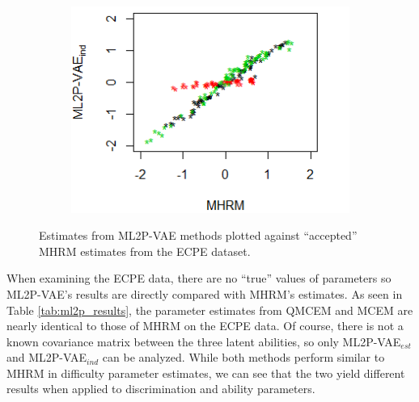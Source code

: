 \begin{figure}[h]
\begin{subfigure}{.32\textwidth}
    \end{subfigure}
    \begin{subfigure}{.32\textwidth}
      \centering
      \includegraphics[width=.9\linewidth]{img/ml_journal_results/ecpe/vae_ind_theta_ecpe.png}
    \end{subfigure}
    \caption{Estimates from ML2P-VAE methods plotted against ``accepted'' MHRM estimates from the ECPE dataset.}
    \label{fig:ecpe_cor}
\end{figure}

When examining the ECPE data, there are no ``true'' values of parameters so ML2P-VAE's results are directly compared with MHRM's estimates. As seen in Table \ref{tab:ml2p_results}, the parameter estimates from QMCEM and MCEM are nearly identical to those of MHRM on the ECPE data. Of course, there is not a known covariance matrix between the three latent abilities, so only ML2P-VAE$_{est}$ and ML2P-VAE$_{ind}$ can be analyzed. While both methods perform similar to MHRM in difficulty parameter estimates, we can see that the two yield different results when applied to discrimination and ability parameters. 

